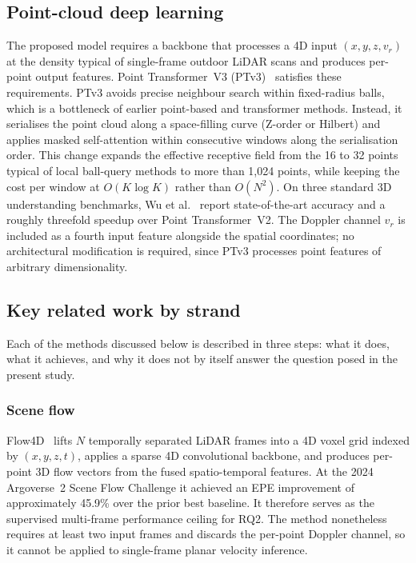 \documentclass[a4paper,12pt]{article}
\begin{document}
\subsection{Point-cloud deep learning}

The proposed model requires a backbone that processes a 4D input $(x, y, z, v_r)$ at the density typical of single-frame outdoor LiDAR scans and produces per-point output features. Point Transformer~V3 (PTv3)~\cite{wu2024pointtransformerv3} satisfies these requirements. PTv3 avoids precise neighbour search within fixed-radius balls, which is a bottleneck of earlier point-based and transformer methods. Instead, it serialises the point cloud along a space-filling curve (Z-order or Hilbert) and applies masked self-attention within consecutive windows along the serialisation order. This change expands the effective receptive field from the 16 to 32 points typical of local ball-query methods to more than 1{,}024 points, while keeping the cost per window at $O(K \log K)$ rather than $O(N^2)$. On three standard 3D understanding benchmarks, Wu et al.~\cite{wu2024pointtransformerv3} report state-of-the-art accuracy and a roughly threefold speedup over Point Transformer~V2. The Doppler channel $v_r$ is included as a fourth input feature alongside the spatial coordinates; no architectural modification is required, since PTv3 processes point features of arbitrary dimensionality.

\subsection{Key related work by strand}

Each of the methods discussed below is described in three steps: what it does, what it achieves, and why it does not by itself answer the question posed in the present study.

\subsubsection{Scene flow}

Flow4D~\cite{cho2025flow4d} lifts $N$ temporally separated LiDAR frames into a 4D voxel grid indexed by $(x, y, z, t)$, applies a sparse 4D convolutional backbone, and produces per-point 3D flow vectors from the fused spatio-temporal features. At the 2024 Argoverse~2 Scene Flow Challenge it achieved an EPE improvement of approximately 45.9\% over the prior best baseline. It therefore serves as the supervised multi-frame performance ceiling for RQ2. The method nonetheless requires at least two input frames and discards the per-point Doppler channel, so it cannot be applied to single-frame planar velocity inference.
\end{document}
